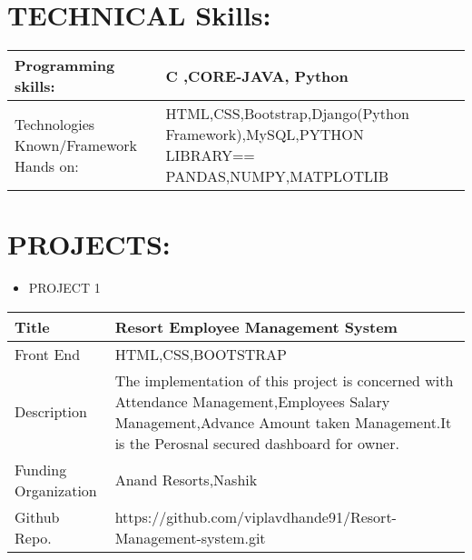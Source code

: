 \documentclass[a4paper,10pt]{article}
\begin{document}
\section{TECHNICAL Skills:}

\begin{tabu} to 0.8\textwidth { | X[l] | X[l] |  }
 \hline
 \large  Programming skills:  & C ,CORE-JAVA, Python\\
 
 \hline
\large  Technologies Known/Framework Hands on:  &   HTML,CSS,Bootstrap,Django(Python Framework),MySQL,PYTHON LIBRARY== PANDAS,NUMPY,MATPLOTLIB  \\
  


\hline
\end{tabu}






\section{PROJECTS:}

\renewcommand{\labelitemi}{$\blacksquare$}
 
 
 \begin{itemize}
   \item {\large PROJECT 1}
   
 \end{itemize}


\begin{tabu} to 0.9\textwidth { | X[l] | X[2.5] | }
 \hline
 \large Title & Resort Employee Management System\\
 
 \hline
\large Front End  & HTML,CSS,BOOTSTRAP\\
 
\hline
\large Description & The implementation of this project is concerned with Attendance Management,Employees Salary Management,Advance Amount taken Management.It is the Perosnal secured dashboard for owner. \\
\hline
\hline
\large Funding Organization & Anand Resorts,Nashik \\
\hline

\large Github Repo. & https://github.com/viplavdhande91/Resort-Management-system.git \\
 

 
\hline
\end{tabu}
 
\end{document}
